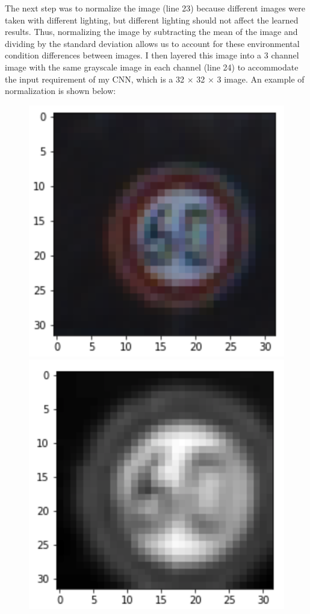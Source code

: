 \documentclass[12pt]{article}
\begin{document}
\begin{figure}[H]
\end{figure}

The next step was to normalize the image (line 23) because different images were taken with different lighting, but different lighting should not affect the learned results. Thus, normalizing the image by subtracting the mean of the image and dividing by the standard deviation allows us to account for these environmental condition differences between images. I then layered this image into a 3 channel image with the same grayscale image in each channel (line 24) to accommodate the input requirement of my CNN, which is a 32 $\times$ 32 $\times$ 3 image. An example of normalization is shown below:
\begin{figure}[!h]
\centering
\includegraphics[scale = 0.5]{writeup_images/im1.png}
\includegraphics[scale = 0.5]{writeup_images/normalized.png}
\end{figure}
\end{document}
